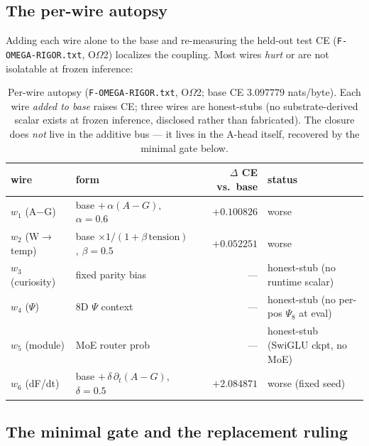 \subsection{The per-wire autopsy}
\label{app:omega-autopsy}

Adding each wire alone to the base and re-measuring the held-out test CE
(\texttt{F-OMEGA-RIGOR.txt}, O$\Omega$2) localizes the coupling. Most wires
\emph{hurt} or are not isolatable at frozen inference:
\begin{table}[h]
\centering
\small
\setlength{\tabcolsep}{6pt}
\begin{tabular}{@{}l l r l@{}}
\toprule
\textbf{wire} & \textbf{form} & \textbf{$\Delta$ CE vs.\ base} & \textbf{status} \\
\midrule
$w_1$ (A$-$G)   & base $+\,\alpha(A{-}G)$, $\alpha{=}0.6$ & $+0.100826$ & worse \\
$w_2$ (W$\to$temp) & base $\times 1/(1{+}\beta\,\text{tension})$, $\beta{=}0.5$ & $+0.052251$ & worse \\
$w_3$ (curiosity) & fixed parity bias & --- & honest-stub (no runtime scalar) \\
$w_4$ ($\Psi$) & 8D $\Psi$ context & --- & honest-stub (no per-pos $\Psi_8$ at eval) \\
$w_5$ (module) & MoE router prob & --- & honest-stub (SwiGLU ckpt, no MoE) \\
$w_6$ (dF/dt) & base $+\,\delta\,\partial_t(A{-}G)$, $\delta{=}0.5$ & $+2.084871$ & worse (fixed seed) \\
\bottomrule
\end{tabular}
\caption{Per-wire autopsy (\texttt{F-OMEGA-RIGOR.txt}, O$\Omega$2; base CE
$3.097779$ nats/byte). Each wire \emph{added to base} raises CE; three wires are
honest-stubs (no substrate-derived scalar exists at frozen inference, disclosed
rather than fabricated). The closure does \emph{not} live in the additive bus ---
it lives in the A-head itself, recovered by the minimal gate below.}
\label{tab:omega-autopsy}
\end{table}

\subsection{The minimal gate and the replacement ruling}
\label{app:omega-mingate}

